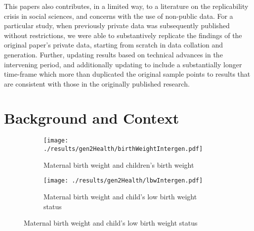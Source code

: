 \documentclass[11pt]{article}
\begin{document}
\begin{spacing}{1.5}
  This papers also contributes, in a limited way, to a literature on the replicability crisis in social sciences, and concerns with the use of non-public data.  For a particular study, when previously private data was subsequently published without restrictions, we were able to substantively replicate the findings of the original paper's private data, starting from scratch in data collation and generation.  Further, updating results based on technical advances in the intervening period, and additionally updating to include a substantially longer time-frame which more than duplicated the original sample points to results that are consistent with those in the originally published research. 

  
  
  \clearpage
  \section{Background and Context}

  \begin{figure}[htpb!]
    \caption{Intergenerational Transmission of Early Life Health Measures}
    \label{fig:intergen}
    \begin{subfigure}{0.99\textwidth}
      \centering
      \texttt{[image: ./results/gen2Health/birthWeightIntergen.pdf]}
      \caption{Maternal birth weight and children's birth weight}
      \label{fig:intergenBW}
    \end{subfigure}
    \begin{subfigure}{0.99\textwidth}
      \centering
      \texttt{[image: ./results/gen2Health/lbwIntergen.pdf]}
      \caption{Maternal birth weight and child's low birth weight status}
      \label{fig:intergenLBW}
    \end{subfigure}
  \end{figure}
  
  
  
  \clearpage

\end{spacing}
\end{document}
